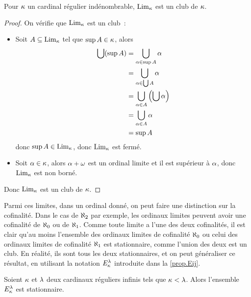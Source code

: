 \begin{proposition}
  Pour $\kappa$ un cardinal régulier indénombrable, $\operatorname{Lim}_\kappa$ est un club
  de $\kappa$.
\end{proposition}

\begin{proof}
  On vérifie que $\operatorname{Lim}_\kappa$ est un club~:
  \begin{itemize}
  \item Soit $A\subseteq \operatorname{Lim}_\kappa$ tel que $\sup A \in \kappa$,
    alors
    \begin{align*}
      \bigcup (\sup A) &= \bigcup_{\alpha \in \sup A} \alpha \\
      &= \bigcup_{\alpha \in \bigcup A} \alpha \\
      &= \bigcup_{\alpha \in A} \left(\bigcup \alpha\right)\\
      &= \bigcup_{\alpha \in A} \alpha\\
      &= \sup A
    \end{align*}
    donc $\sup A \in \operatorname{Lim}_\kappa$, donc $\operatorname{Lim}_\kappa$ est fermé.
  \item Soit $\alpha \in \kappa$, alors $\alpha + \omega$ est un ordinal limite
    et il est supérieur à $\alpha$, donc $\operatorname{Lim}_\kappa$ est non borné.
  \end{itemize}
  Donc $\operatorname{Lim}_\kappa$ est un club de $\kappa$.
\end{proof}

Parmi ces limites, dans un ordinal donné, on peut faire une distinction sur la
cofinalité. Dans le cas de $\aleph_2$ par exemple, les ordinaux limites peuvent
avoir une cofinalité de $\aleph_0$ ou de $\aleph_1$. Comme toute limite a l'une
des deux cofinalités, il est clair qu'au moins l'ensemble des ordinaux limites
de cofinalité $\aleph_0$ ou celui des ordinaux limites de cofinalité $\aleph_1$
est stationnaire, comme l'union des deux est un club. En réalité, ils sont
tous les deux stationnaires, et on peut généraliser ce résultat, en utilisant
la notation $E_{\kappa}^{\lambda}$ introduite dans la \cref{prop.Eij}.

\begin{proposition}
  Soient $\kappa$ et $\lambda$ deux cardinaux réguliers infinis tels que
  $\kappa < \lambda$. Alors l'ensemble $E_{\kappa}^{\lambda}$ est stationnaire.
\end{proposition}

